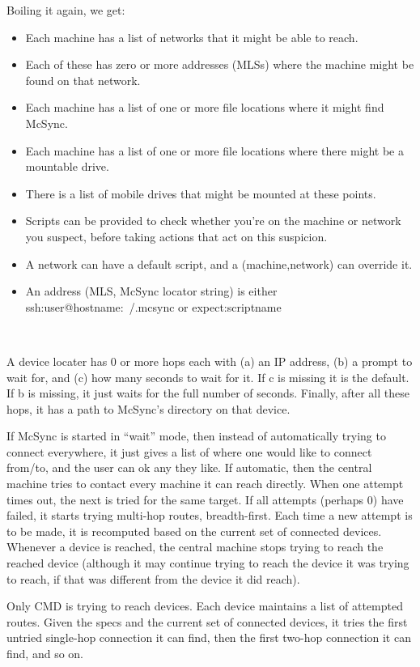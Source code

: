 \documentclass{book}
\begin{document}
Boiling it again, we get:
\begin{itemize}
\item Each machine has a list of networks that it might be able to reach.
\item Each of these has zero or more addresses (MLSs) where the machine might be found on that network.
\item Each machine has a list of one or more file locations where it might find McSync.
\item Each machine has a list of one or more file locations where there might be a mountable drive.
\item There is a list of mobile drives that might be mounted at these points.
\item Scripts can be provided to check whether you're on the machine or network you suspect,
before taking actions that act on this suspicion.
\item A network can have a default script, and a (machine,network) can override it.
\item An address (MLS, McSync locator string) is either ssh:user@hostname:~/.mcsync or expect:scriptname
\end{itemize}

~

A device locater has 0 or more hops each with (a) an IP address, (b) a prompt to wait for, and (c) how many seconds to wait for it.  If c is missing it is the default.  If b is missing, it just waits for the full number of seconds.  Finally, after all these hops, it has a path to McSync's directory on that device.

If McSync is started in ``wait'' mode, then instead of automatically trying to connect everywhere, it just gives a list of where one would like to connect from/to, and the user can ok any they like.  If automatic, then the central machine tries to contact every machine it can reach directly.  When one attempt times out, the next is tried for the same target.  If all attempts (perhaps 0) have failed, it starts trying multi-hop routes, breadth-first.  Each time a new attempt is to be made, it is recomputed based on the current set of connected devices.  Whenever a device is reached, the central machine stops trying to reach the reached device (although it may continue trying to reach the device it was trying to reach, if that was different from the device it did reach).

Only CMD is trying to reach devices.  Each device maintains a list of attempted routes.  Given the specs and the current set of connected devices, it tries the first untried single-hop connection it can find, then the first two-hop connection it can find, and so on.
\end{document}
